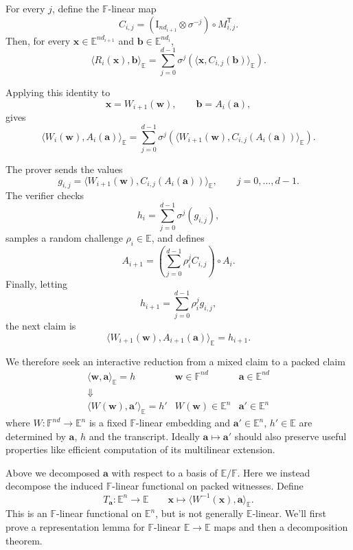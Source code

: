 \documentclass[11pt,letterpaper,usenames,dvipsnames]{article}
\begin{document}
For every $j$, define the $\mathbb F$-linear map
\[
C_{i,j}
=
(\mathrm I_{nd_{i+1}}\otimes\sigma^{-j})
\circ
M_{i,j}^{\mathsf T}.
\]
Then, for every
$\mathbf x\in\mathbb E^{nd_{i+1}}$
and
$\mathbf b\in\mathbb E^{nd_i}$,
\[
\langle R_i(\mathbf x),\mathbf b\rangle_{\mathbb E}
=
\sum_{j=0}^{d-1}
\sigma^j\!\left(
\langle
\mathbf x,
C_{i,j}(\mathbf b)
\rangle_{\mathbb E}
\right).
\]

Applying this identity to
\[
\mathbf x=W_{i+1}(\mathbf w),
\qquad
\mathbf b=A_i(\mathbf a),
\]
gives
\[
\langle
W_i(\mathbf w),
A_i(\mathbf a)
\rangle_{\mathbb E}
=
\sum_{j=0}^{d-1}
\sigma^j\!\left(
\langle
W_{i+1}(\mathbf w),
C_{i,j}(A_i(\mathbf a))
\rangle_{\mathbb E}
\right).
\]

The prover sends the values
\[
g_{i,j}
=
\langle
W_{i+1}(\mathbf w),
C_{i,j}(A_i(\mathbf a))
\rangle_{\mathbb E},
\qquad
j=0,\ldots,d-1.
\]
The verifier checks
\[
h_i
=
\sum_{j=0}^{d-1}
\sigma^j(g_{i,j}),
\]
samples a random challenge
$\rho_i\in\mathbb E$,
and defines
\[
A_{i+1}
=
\left(
\sum_{j=0}^{d-1}
\rho_i^j C_{i,j}
\right)
\circ A_i.
\]
Finally, letting
\[
h_{i+1}
=
\sum_{j=0}^{d-1}
\rho_i^j g_{i,j},
\]
the next claim is
\[
\langle
W_{i+1}(\mathbf w),
A_{i+1}(\mathbf a)
\rangle_{\mathbb E}
=
h_{i+1}.
\]


We therefore seek an interactive reduction from a mixed claim to a packed claim
\[
\begin{array}{ccc}
\langle \mathbf{w}, \mathbf{a}\rangle_\mathbb{E} = h
&
\mathbf{w} \in \mathbb{F}^{nd}
&
\mathbf{a} \in \mathbb{E}^{nd}
\\[.8ex]
\Downarrow
\\[1.3ex]
\langle W(\mathbf{w}), \mathbf{a}'\rangle_\mathbb{E} = h'
&
W(\mathbf{w}) \in \mathbb{E}^{n}
&
\mathbf{a}' \in \mathbb{E}^{n}
\end{array}
\]
where $W: \mathbb{F}^{nd} \to \mathbb{E}^{n}$ is a fixed $\mathbb{F}$-linear embedding and $\mathbf{a}' \in \mathbb{E}^{n}$, $h' \in \mathbb{E}$ are determined by $\mathbf{a}$, $h$ and the transcript. Ideally $\mathbf{a} \mapsto \mathbf{a}'$ should also preserve useful properties like efficient computation of its multilinear extension.

Above we decomposed $\mathbf{a}$ with respect to a basis of $\mathbb{E}/\mathbb{F}$. Here we instead decompose the induced $\mathbb F$-linear functional on packed witnesses. Define
\[
T_{\mathbf{a}} : \mathbb{E}^n \to \mathbb{E} \qquad \mathbf{x} \mapsto \langle W^{-1}(
\mathbf{x}), \mathbf{a} \rangle_{\mathbb{E}}\text{.}
\]
This is an $\mathbb{F}$-linear functional on $\mathbb E^n$, but is not generally $\mathbb{E}$-linear. We'll first prove a representation lemma for $\mathbb{F}$-linear $\mathbb{E}\to\mathbb{E}$ maps and then a decomposition theorem.
\end{document}
